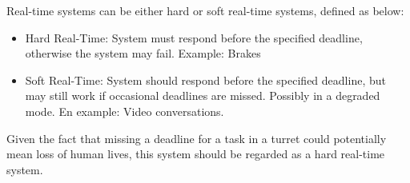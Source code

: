 Real-time systems can be either hard or soft real-time systems, defined as below:
\begin{itemize}
\item Hard Real-Time: System must respond before the specified deadline, otherwise the system may fail. Example: Brakes
\item Soft Real-Time: System should respond before the specified deadline, but may still work if occasional deadlines are missed. Possibly in a degraded mode. En example: Video conversations.
\end{itemize}\cite{realtime}

Given the fact that missing a deadline for a task in a turret could potentially mean loss of human lives, this system should be regarded as a hard real-time system.
